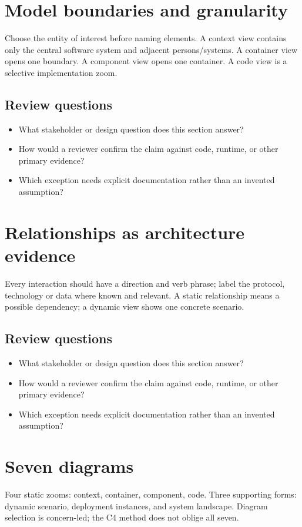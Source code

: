 \documentclass[10pt,letterpaper]{article}
\begin{document}
\section{Model boundaries and granularity}
Choose the entity of interest before naming elements. A context view contains only the central software system and adjacent persons/systems. A container view opens one boundary. A component view opens one container. A code view is a selective implementation zoom.


\subsection{Review questions}
\begin{itemize}
\item What stakeholder or design question does this section answer?
\item How would a reviewer confirm the claim against code, runtime, or other primary evidence?
\item Which exception needs explicit documentation rather than an invented assumption?
\end{itemize}

\section{Relationships as architecture evidence}
Every interaction should have a direction and verb phrase; label the protocol, technology or data where known and relevant. A static relationship means a possible dependency; a dynamic view shows one concrete scenario.


\subsection{Review questions}
\begin{itemize}
\item What stakeholder or design question does this section answer?
\item How would a reviewer confirm the claim against code, runtime, or other primary evidence?
\item Which exception needs explicit documentation rather than an invented assumption?
\end{itemize}

\section{Seven diagrams}
Four static zooms: context, container, component, code. Three supporting forms: dynamic scenario, deployment instances, and system landscape. Diagram selection is concern-led; the C4 method does not oblige all seven.
\end{document}
